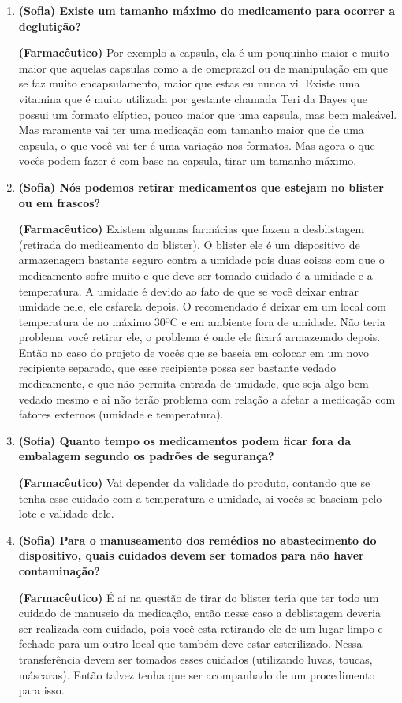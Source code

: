 \begin{apendicesenv}
\begin{enumerate}
\item \textbf{(Sofia) Existe um tamanho máximo do medicamento para ocorrer a deglutição?}

\textbf{(Farmacêutico)} Por exemplo a capsula, ela é um pouquinho maior e muito maior que aquelas capsulas como a de omeprazol ou de manipulação em que se faz muito encapsulamento, maior que estas eu nunca vi. Existe uma vitamina que é muito utilizada por gestante chamada Teri da Bayes que possui um formato elíptico, pouco maior que uma capsula, mas bem maleável. Mas raramente vai ter uma medicação com tamanho maior que de uma capsula, o que você vai ter é uma variação nos formatos. Mas agora o que vocês podem fazer é com base na capsula, tirar um tamanho máximo.

\item \textbf{(Sofia) Nós podemos retirar medicamentos que estejam no blister ou em frascos?}

\textbf{(Farmacêutico)}  Existem algumas farmácias que fazem a desblistagem (retirada do medicamento do blister). O blister ele é um dispositivo de armazenagem bastante seguro contra a umidade pois duas coisas com que o medicamento sofre muito e que deve ser tomado cuidado é a umidade e a temperatura. A umidade é devido ao fato de que se você deixar entrar umidade nele, ele esfarela depois. O recomendado é deixar em um local com temperatura de no máximo 30ºC e em ambiente fora de umidade. Não teria problema você retirar ele, o problema é onde ele ficará armazenado depois. Então no caso do projeto de vocês que se baseia em colocar em um novo recipiente separado, que esse recipiente possa ser bastante vedado medicamente, e que não permita entrada de umidade, que seja algo bem vedado mesmo e ai não terão problema com relação a afetar a medicação com fatores externos (umidade e temperatura). 

\item \textbf{(Sofia) Quanto tempo os medicamentos podem ficar fora da embalagem segundo os padrões de segurança?}

\textbf{(Farmacêutico)} Vai depender da validade do produto, contando que se tenha esse cuidado com a temperatura e umidade, ai vocês se baseiam pelo lote e validade dele.  

\item \textbf{ (Sofia) Para o manuseamento dos remédios no abastecimento do dispositivo, quais cuidados devem ser tomados para não haver contaminação?}

\textbf{(Farmacêutico)} É ai na questão de tirar do blister teria que ter todo um cuidado de manuseio da medicação, então nesse caso a deblistagem deveria ser realizada com cuidado, pois você esta retirando ele de um lugar limpo e fechado para um outro local que também deve estar esterilizado. Nessa transferência devem ser tomados esses cuidados (utilizando luvas, toucas, máscaras). Então talvez tenha que ser acompanhado de um procedimento para isso.


\end{enumerate}
\end{apendicesenv}
